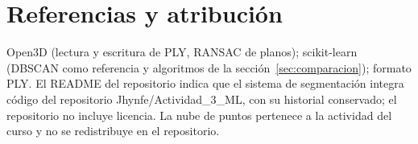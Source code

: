 \documentclass[11pt,a4paper]{article}
\begin{document}
\section*{Referencias y atribución}
Open3D (lectura y escritura de PLY, RANSAC de planos); scikit-learn (DBSCAN como referencia y algoritmos de la sección~\ref{sec:comparacion}); formato PLY. El README del repositorio indica que el sistema de segmentación integra código del repositorio Jhynfe/Actividad\_3\_ML, con su historial conservado; el repositorio no incluye licencia. La nube de puntos pertenece a la actividad del curso y no se redistribuye en el repositorio.
\end{document}
